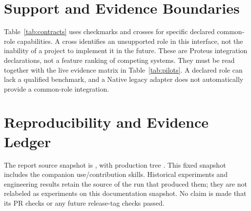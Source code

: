 \section{Support and Evidence Boundaries}
\label{app:support}

Table~\ref{tab:contracts} uses checkmarks and crosses for specific declared common-role capabilities. A cross identifies an unsupported role in this interface, not the inability of a project to implement it in the future. These are Proteus integration declarations, not a feature ranking of competing systems. They must be read together with the live evidence matrix in Table~\ref{tab:pilots}. A declared role can lack a qualified benchmark, and a Native legacy adapter does not automatically provide a common-role integration.



\section{Reproducibility and Evidence Ledger}
\label{app:evidence}

The report source snapshot is , with production tree . This fixed snapshot includes the companion use/contribution skills. Historical experiments and engineering results retain the source of the run that produced them; they are not relabeled as experiments on this documentation snapshot. No claim is made that its PR checks or any future release-tag checks passed.

